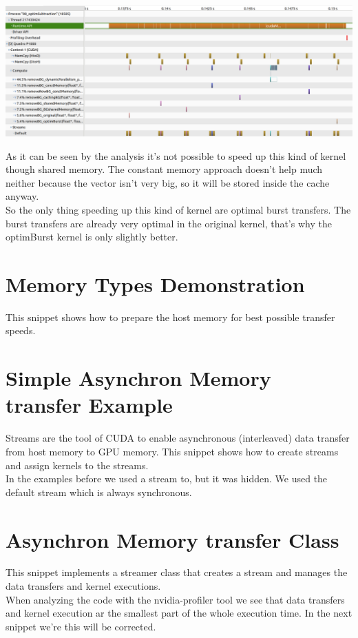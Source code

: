 \includegraphics[width=\textwidth]{imgs/compareBGremoval.png}

As it can be seen by the analysis it's not possible to speed up this kind of kernel though shared memory. The constant memory approach doesn't help much neither because the vector isn't very big, so it will be stored inside the cache anyway.\\
So the only thing speeding up this kind of kernel are optimal burst transfers. The burst transfers are already very optimal in the original kernel, that's why the optimBurst kernel is only slightly better.


\section{Memory Types Demonstration}
This snippet shows how to prepare the host memory for best possible transfer speeds.


\section{Simple Asynchron Memory transfer Example}
Streams are the tool of CUDA to enable asynchronous (interleaved) data transfer from host memory to GPU memory. This snippet shows how to create streams and assign kernels to the streams.\\
In the examples before we used a stream to, but it was hidden. We used the default stream which is always synchronous.
\cite[CUDA Programming Guide, chapter 3.2.5.5ff]{cudaGuide}
\pagebreak

\section{Asynchron Memory transfer Class}
This snippet implements a streamer class that creates a stream and manages the data transfers and kernel executions.\\
When analyzing the code with the nvidia-profiler tool we see that data transfers and kernel execution ar the smallest part of the whole execution time. In the next snippet we're this will be corrected.\\

